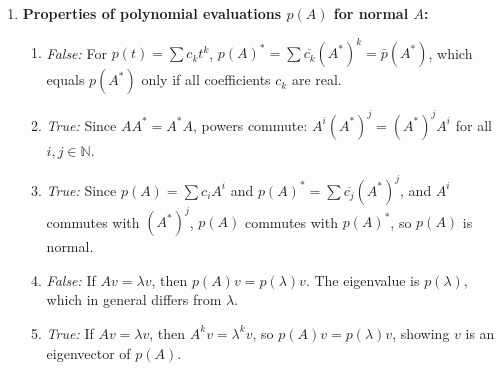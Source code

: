 \begin{exercisesolution*}
\begin{enumerate}[label=\textbf{(\alph*)}]
    \item \textbf{Properties of polynomial evaluations $p(A)$ for normal $A$:}
    \begin{enumerate}[label=\textbf{(\roman*)}]
        \item \emph{False:} For $p(t) = \sum c_k t^k$, $p(A)^* = \sum \overline{c_k} (A^*)^k = \bar{p}(A^*)$, which equals $p(A^*)$ only if all coefficients $c_k$ are real.
        \item \emph{True:} Since $A A^* = A^* A$, powers commute: $A^i (A^*)^j = (A^*)^j A^i$ for all $i, j \in \mathbb{N}$.
        \item \emph{True:} Since $p(A) = \sum c_i A^i$ and $p(A)^* = \sum \overline{c_j} (A^*)^j$, and $A^i$ commutes with $(A^*)^j$, $p(A)$ commutes with $p(A)^*$, so $p(A)$ is normal.
        \item \emph{False:} If $Av = \lambda v$, then $p(A)v = p(\lambda)v$. The eigenvalue is $p(\lambda)$, which in general differs from $\lambda$.
        \item \emph{True:} If $Av = \lambda v$, then $A^k v = \lambda^k v$, so $p(A)v = p(\lambda)v$, showing $v$ is an eigenvector of $p(A)$. \qedhere
    \end{enumerate}
\end{enumerate}
\end{exercisesolution*}
